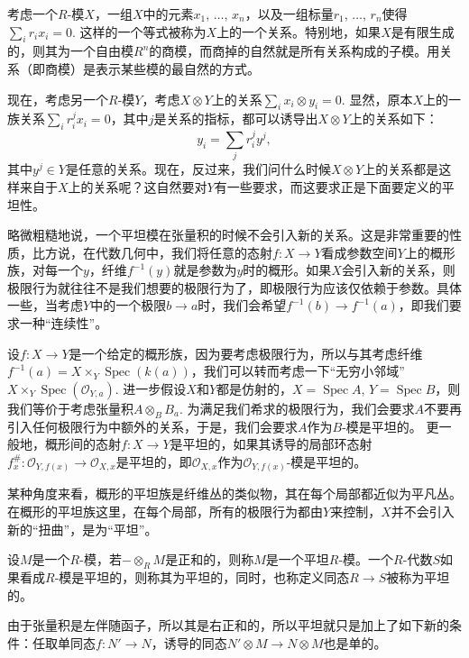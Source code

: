 \begin{para}[关系]
	考虑一个$R$-模$X$，一组$X$中的元素$x_1$, $\dots$, $x_n$，以及一组标量$r_1$, $\dots$, $r_n$使得$\sum_{i}r_ix_i=0$. 这样的一个等式被称为$X$上的一个关系。特别地，如果$X$是有限生成的，则其为一个自由模$R^n$的商模，而商掉的自然就是所有关系构成的子模。用关系（即商模）是表示某些模的最自然的方式。

	现在，考虑另一个$R$-模$Y$，考虑$X\otimes Y$上的关系$\sum_i x_i\otimes y_i=0$. 显然，原本$X$上的一族关系$\sum_i r_i^{j}x_i=0$，其中$j$是关系的指标，都可以诱导出$X\otimes Y$上的关系如下：
	\[
		y_i=\sum_{j}r^j_i y^j,
	\]
	其中$y^j\in Y$是任意的关系。现在，反过来，我们问什么时候$X\otimes Y$上的关系都是这样来自于$X$上的关系呢？这自然要对$Y$有一些要求，而这要求正是下面要定义的平坦性。
	
	略微粗糙地说，一个平坦模在张量积的时候不会引入新的关系。这是非常重要的性质，比方说，在代数几何中，我们将任意的态射$f:X\to Y$看成参数空间$Y$上的概形族，对每一个$y$，纤维$f^{-1}(y)$就是参数为$y$时的概形。如果$X$会引入新的关系，则极限行为就往往不是我们想要的极限行为了，即极限行为应该仅依赖于参数。具体一些，当考虑$Y$中的一个极限$b\to a$时，我们会希望$f^{-1}(b)\to f^{-1}(a)$，即我们要求一种“连续性”。
	
	设$f:X\to Y$是一个给定的概形族，因为要考虑极限行为，所以与其考虑纤维$f^{-1}(a)=X\times_Y \operatorname{Spec}(k(a))$，我们可以转而考虑一下“无穷小邻域”$X\times_Y \operatorname{Spec}(\mathcal O_{Y,a})$. 进一步假设$X$和$Y$都是仿射的，$X=\operatorname{Spec} A$, $Y=\operatorname{Spec} B$，则我们等价于考虑张量积$A\otimes_B B_{a}$. 为满足我们希求的极限行为，我们会要求$A$不要再引入任何极限行为中额外的关系，于是，我们会要求$A$作为$B$-模是平坦的。
	更一般地，概形间的态射$f:X\to Y$是平坦的，如果其诱导的局部环态射$f^\#_{x}:\mathcal O_{Y,f(x)}\to \mathcal O_{X,x}$是平坦的，即$\mathcal O_{X,x}$作为$\mathcal O_{Y,f(x)}$-模是平坦的。

	某种角度来看，概形的平坦族是纤维丛的类似物，其在每个局部都近似为平凡丛。在概形的平坦族这里，在每个局部，所有的极限行为都由$Y$来控制，$X$并不会引入新的“扭曲”，是为“平坦”。
\end{para}

\begin{para}[平坦性]
	设$M$是一个$R$-模，若$-\otimes_R M$是正和的，则称$M$是一个平坦$R$-模。一个$R$-代数$S$如果看成$R$-模是平坦的，则称其为平坦的，同时，也称定义同态$R\to S$被称为平坦的。
\end{para}

由于张量积是左伴随函子，所以其是右正和的，所以平坦就只是加上了如下新的条件：任取单同态$f:N'\to N$，诱导的同态$N'\otimes M \to N\otimes M$也是单的。

